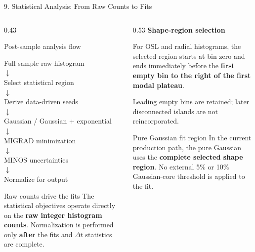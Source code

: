 \documentclass{beamer}
\begin{document}
\begin{frame}{9. Statistical Analysis: From Raw Counts to Fits}
\fontsize{6.8}{7.6}\selectfont

\begin{columns}[T]

\begin{column}{0.43\textwidth}
\begin{block}{Post-sample analysis flow}
\begin{center}
Full-sample raw histogram\\[-0.15em]
$\downarrow$\\[-0.15em]
Select statistical region\\[-0.15em]
$\downarrow$\\[-0.15em]
Derive data-driven seeds\\[-0.15em]
$\downarrow$\\[-0.15em]
Gaussian \quad / \quad Gaussian + exponential\\[-0.15em]
$\downarrow$\\[-0.15em]
MIGRAD minimization\\[-0.15em]
$\downarrow$\\[-0.15em]
MINOS uncertainties\\[-0.15em]
$\downarrow$\\[-0.15em]
Normalize for output
\end{center}
\end{block}

\vspace{-0.25em}
\begin{alertblock}{Raw counts drive the fits}
The statistical objectives operate directly on the \textbf{raw integer histogram counts}. Normalization is performed only \textbf{after} the fits and $\Delta t$ statistics are complete.
\end{alertblock}
\end{column}

\begin{column}{0.53\textwidth}
\textbf{Shape-region selection}

\smallskip
For OSL and radial histograms, the selected region starts at bin zero and ends immediately before the \textbf{first empty bin to the right of the first modal plateau}.

\smallskip
Leading empty bins are retained; later disconnected islands are not reincorporated.

\medskip
\begin{block}{Pure Gaussian fit region}
In the current production path, the pure Gaussian uses the \textbf{complete selected shape region}. No external 5\% or 10\% Gaussian-core threshold is applied to the fit.
\end{block}


\end{column}
\end{columns}
\end{frame}
\end{document}
